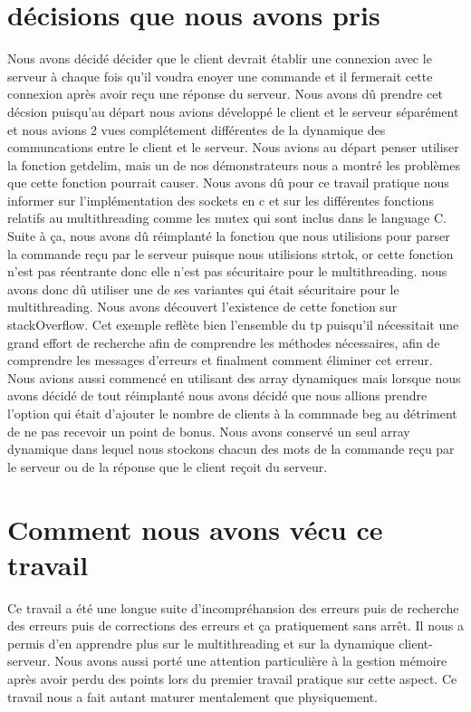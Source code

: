 \documentclass[11pt]{article}
\begin{document}
\section{décisions que nous avons pris }
 Nous avons décidé décider que le client devrait établir une connexion avec le serveur à chaque fois qu'il voudra enoyer une commande et il fermerait cette connexion après avoir reçu une réponse du serveur. Nous avons dû prendre cet décsion  puisqu'au départ nous avions développé le client et le serveur séparément et nous avions 2 vues complétement différentes de la dynamique des communcations entre le client et le serveur. Nous avions au départ penser utiliser la fonction getdelim, mais un de nos démonstrateurs nous a  montré les problèmes que cette fonction pourrait causer. Nous avons dû pour ce travail pratique nous informer sur l'implémentation des sockets en c et sur les différentes fonctions relatifs au multithreading comme les mutex qui sont inclus dans le language C. Suite à ça, nous avons dû réimplanté la fonction que nous utilisions pour parser la commande reçu par le serveur puisque nous utilisions strtok, or cette fonction n'est pas réentrante donc elle n'est pas sécuritaire pour le multithreading. nous avons donc dû utiliser une de ses variantes  qui  était sécuritaire pour le multithreading. Nous avons découvert l'existence de cette fonction sur stackOverflow. Cet exemple reflète bien l'ensemble du tp puisqu'il nécessitait une grand  effort de recherche afin de comprendre les méthodes nécessaires, afin de comprendre les messages d'erreurs et finalment comment éliminer cet erreur. Nous avions aussi commencé en utilisant des array dynamiques mais lorsque nous avons décidé de tout réimplanté nous avons décidé que nous allions prendre l'option qui était d'ajouter le nombre de clients à la commnade beg au détriment de ne pas recevoir un point de bonus. Nous avons conservé un seul array dynamique dans lequel nous stockons chacun des mots de la commande reçu par le serveur ou de la réponse que le client reçoit du serveur.


\section{Comment nous avons vécu ce travail}
Ce travail a été une longue suite d'incompréhansion des erreurs puis de recherche des erreurs puis de corrections des erreurs et ça pratiquement sans arrêt. Il nous a permis d'en apprendre plus sur le multithreading et sur la dynamique client-serveur. Nous avons aussi porté une attention particulière à la gestion mémoire après avoir perdu des points lors du premier travail pratique sur cette aspect. Ce travail nous a fait autant maturer mentalement que physiquement. 



\end{document}
